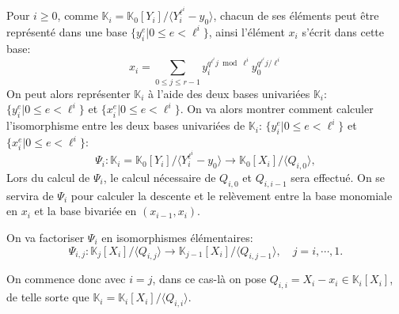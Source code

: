 \documentclass[10pt,a4paper]{book}
\theoremstyle{plain}
\theoremstyle{definition}
\theoremstyle{definition}
\theoremstyle{definition}
\theoremstyle{definition}
\theoremstyle{remark}
\theoremstyle{remark}
\theoremstyle{definition}
\begin{document}
Pour $i \geqslant 0$, comme $\mathbb{K}_i=\mathbb{K}_0[Y_i]/\langle Y_i^{\ell^i} - y_0 \rangle$, chacun de ses éléments peut être représenté dans une base $ \{y_i^e | 0 \leqslant e < \ell^i \} $, ainsi l'élément $x_i$ s'écrit dans cette base:
\begin{equation*}
x_i= \sum_{0 \leqslant j \leqslant r-1}y_i^{q^{\ell^i}j \bmod \ell^i}y_0^{q^{\ell^i}j / \ell^i}
\end{equation*}
On peut alors représenter $\mathbb{K}_i$ à l'aide des deux bases univariées $\mathbb{K}_i$: $\{ y_i^e | 0 \leqslant e < \ell^i\}$ et $\{x_i^e | 0 \leqslant e < \ell^i\}$. On va alors montrer comment calculer l'isomorphisme entre les deux bases univariées de $\mathbb{K}_i$: $\{ y_i^e | 0 \leqslant e < \ell^i\}$ et $\{x_i^e | 0 \leqslant e < \ell^i\}$:
\begin{equation*}
\Psi_i: \mathbb{K}_i=\mathbb{K}_0[Y_i]/\langle Y_i^{\ell^i}-y_0 \rangle \to \mathbb{K}_0[X_i]/\langle Q_{i,0} \rangle,
\end{equation*}
 Lors du calcul de $\Psi_i$, le calcul nécessaire de $Q_{i,0}$ et $Q_{i,i-1}$ sera effectué. On se servira de $\Psi_i$ pour calculer la descente et le relèvement entre la base monomiale en $x_i$ et la base bivariée en $(x_{i-1},x_i)$.
 
 On va factoriser $\Psi_i$ en isomorphismes élémentaires:
 \begin{equation*}
 \Psi_{i,j}:\mathbb{K}_{j}[X_i]/\langle Q_{i,j} \rangle \to \mathbb{K}_{j-1}[X_i]/ \langle Q_{i,j-1} \rangle, \quad j=i, \cdots,1. 
 \end{equation*}
 
On commence donc avec $i=j$, dans ce cas-là on pose $Q_{i,i}=X_i-x_i \in \mathbb{K}_i[X_i]$, de telle sorte que $\mathbb{K}_i=\mathbb{K}_i[X_i] / \langle Q_{i,i} \rangle $.
\end{document}
